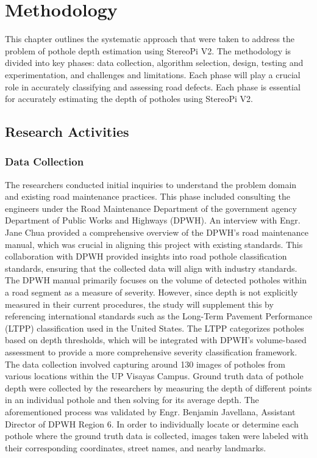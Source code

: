 \chapter{Methodology}
This chapter outlines the systematic approach that were taken to address the problem of pothole depth estimation using StereoPi V2. The methodology is divided into key phases: data collection, algorithm selection, design, testing and experimentation, and challenges and limitations. Each phase will play a crucial role in accurately classifying and assessing road defects.  Each phase is essential for accurately estimating the depth of potholes using StereoPi V2. 

\section{\textbf{ Research Activities} }

\subsection{\textbf{Data Collection} }
The researchers conducted initial inquiries to understand the problem domain and existing road maintenance practices. This phase included consulting the engineers under the Road Maintenance Department of the government agency Department of Public Works and Highways (DPWH). An interview with Engr. Jane Chua provided a comprehensive overview of the DPWH's road maintenance manual, which was crucial in aligning this project with existing standards. This collaboration with DPWH provided insights into road pothole classification standards, ensuring that the collected data will align with industry standards. The DPWH manual primarily focuses on the volume of detected potholes within a road segment as a measure of severity. However, since depth is not explicitly measured in their current procedures, the study will supplement this by referencing international standards such as the Long-Term Pavement Performance (LTPP) classification used in the United States. The LTPP categorizes potholes based on depth thresholds, which will be integrated with DPWH’s volume-based assessment to provide a more comprehensive severity classification framework. The data collection involved capturing around 130 images of potholes from various locations within the UP Visayas Campus. Ground truth data of pothole depth were collected by the researchers by measuring the depth of different points in an individual pothole and then solving for its average depth. The aforementioned process was validated by Engr. Benjamin Javellana, Assistant Director of DPWH Region 6. In order to individually locate or determine each pothole where the ground truth data is collected, images taken were labeled with their corresponding coordinates, street names, and nearby landmarks.

